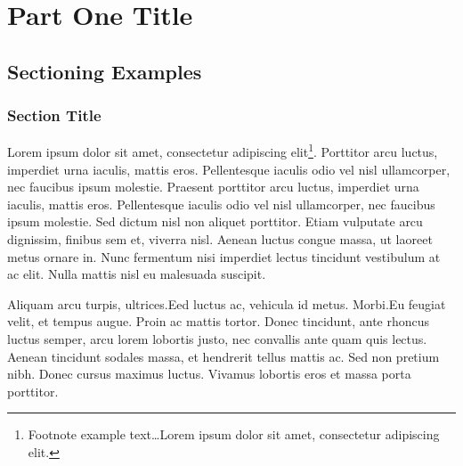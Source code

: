 


\part{Part One Title}


\chapterspaceabove{6.75cm} %
\chapterspacebelow{7.25cm} %




\chapter{Sectioning Examples}



\section{Section Title}

Lorem ipsum dolor sit amet, consectetur adipiscing elit\footnote{Footnote example text\ldots Lorem ipsum dolor sit amet, consectetur adipiscing elit.}.
Porttitor arcu luctus, imperdiet urna iaculis, mattis eros.
Pellentesque iaculis odio vel nisl ullamcorper, nec faucibus ipsum molestie.
Praesent porttitor arcu luctus, imperdiet urna iaculis, mattis eros.
Pellentesque iaculis odio vel nisl ullamcorper, nec faucibus ipsum molestie.
Sed dictum nisl non aliquet porttitor.
Etiam vulputate arcu dignissim, finibus sem et, viverra nisl.
Aenean luctus congue massa, ut laoreet metus ornare in.
Nunc fermentum nisi imperdiet lectus tincidunt vestibulum at ac elit.
Nulla mattis nisl eu malesuada suscipit.

Aliquam arcu turpis, ultrices.Eed luctus ac, vehicula id metus.
Morbi.Eu feugiat velit, et tempus augue.
Proin ac mattis tortor.
Donec tincidunt, ante rhoncus luctus semper, arcu lorem lobortis justo, nec convallis ante quam quis lectus.
Aenean tincidunt sodales massa, et hendrerit tellus mattis ac.
Sed non pretium nibh.
Donec cursus maximus luctus.
Vivamus lobortis eros et massa porta porttitor.



